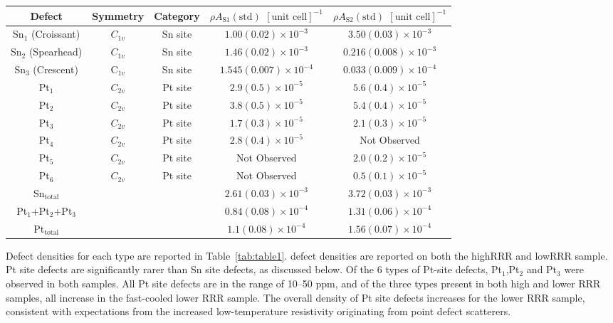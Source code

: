 \begin{table*}
		\renewcommand{\arraystretch}{1.5}  %
		\caption{Defect statistics of two samples of PtSn$_4$ grown at two different cooling rates: slow-cooled sample S1 (\ac{RRR}~$>1000$) and fast-cooled sample S2 (\ac{RRR}~$=200$).} \label{tab:table1}
		\begin{tabular}{ccccc}
			Defect & Symmetry & Category & $\rho A_{\text{S1}}(\text{std})$ $[\text{unit cell}]^{-1}$ & $\rho A_{\text{S2}}(\text{std})$ $[\text{unit cell}]^{-1}$ \\ 
			\hline
			Sn$_1$ (Croissant) & $C_{1v}$ & Sn site & $1.00(0.02) \times 10^{-3}$ & $3.50(0.03) \times 10^{-3}$ \\
			Sn$_2$ (Spearhead) & $C_{1v}$ & Sn site & $1.46(0.02) \times 10^{-3}$ & $0.216(0.008) \times 10^{-3}$ \\
			Sn$_3$ (Crescent) & C$_{1v}$ & Sn site & $1.545(0.007) \times 10^{-4}$ & $0.033(0.009) \times 10^{-4}$ \\
			\hline
			Pt$_1$ & $C_{2v}$ & Pt site & $2.9(0.5) \times 10^{-5}$ & $5.6(0.4) \times 10^{-5}$ \\
			Pt$_2$ & $C_{2v}$ & Pt site & $3.8(0.5) \times 10^{-5}$ & $5.4(0.4) \times 10^{-5}$ \\
			Pt$_3$ & $C_{2v}$ & Pt site & $1.7(0.3) \times 10^{-5}$ & $2.1(0.3) \times 10^{-5}$ \\
			Pt$_4$ & $C_{2v}$ & Pt site & $2.8(0.4) \times 10^{-5}$ & Not Observed \\
			Pt$_5$ & $C_{2v}$ & Pt site & Not Observed & $2.0(0.2) \times 10^{-5}$ \\
			Pt$_6$ & $C_{2v}$ & Pt site & Not Observed & $0.5(0.1) \times 10^{-5}$ \\
			\hline
			Sn$_{\text{total}}$ &  &  & $2.61(0.03) \times 10^{-3}$ & $3.72(0.03) \times 10^{-3}$ \\
			Pt$_1$+Pt$_2$+Pt$_3$ &  &  & $0.84(0.08) \times 10^{-4}$ & $1.31(0.06) \times 10^{-4}$ \\
			Pt$_{\text{total}}$ &  &  & $1.1(0.08) \times 10^{-4}$ & $1.56(0.07) \times 10^{-4}$ \\
		\end{tabular}
\end{table*}

\par Defect densities for each type are reported in Table~\ref{tab:table1}. defect densities are reported on both the highRRR and lowRRR sample. Pt site defects are significantly rarer than Sn site defects, as discussed below. Of the 6 types of Pt-site defects, Pt$_{1}$,Pt$_{2}$ and Pt$_{3}$ were observed in both samples. All Pt site defects are in the range of 10--50 ppm, and of the three types present in both high and lower RRR samples, all increase in the fast-cooled lower RRR sample. The overall density of Pt site defects increases for the lower RRR sample, consistent with expectations from the increased low-temperature resistivity originating from point defect scatterers.

